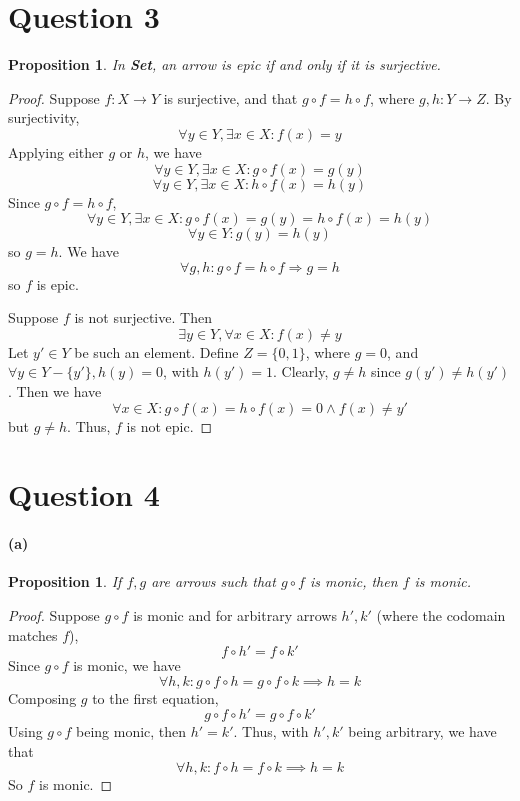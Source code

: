 \documentclass[11pt]{article} %
\newtheorem{proposition}[theorem]{Proposition}
\theoremstyle{definition}
\begin{document}
\section*{Question 3}
\addtocounter{section}{1}
\begin{proposition}
    In \textbf{Set}, an arrow is epic if and only if it is surjective.
\end{proposition}
\begin{proof}
    Suppose $f:X\rightarrow Y$ is surjective, and that $g\circ f=h\circ f$, where $g,h:Y\rightarrow Z$.
    By surjectivity,
    \[\forall y\in Y, \exists x\in X: f(x)=y\]
    Applying either $g$ or $h$, we have
    \[\forall y\in Y, \exists x\in X: g\circ f(x)=g(y)\]
    \[\forall y\in Y, \exists x\in X: h\circ f(x)=h(y)\]
    Since $g\circ f=h\circ f$,
    \[\forall y\in Y, \exists x\in X: g\circ f(x)=g(y)=h\circ f(x)=h(y)\]
    \[\forall y\in Y: g(y)=h(y)\]
    so $g=h$.
    We have 
    \[\forall g,h: g\circ f = h\circ f \Rightarrow g = h\]
    so $f$ is epic.

    Suppose $f$ is not surjective. Then
    \[\exists y\in Y,\forall x\in X: f(x)\neq y\]
    Let $y'\in Y$ be such an element.
    Define $Z=\{0,1\}$, where $g=0$, and $\forall y\in Y-\{y'\},h(y)=0$, with $h(y')=1$.
    Clearly, $g\neq h$ since $g(y')\neq h(y')$.
    Then we have
    \[\forall x\in X: g\circ f(x) = h\circ f(x)=0\wedge f(x)\neq y'\]
    but $g\neq h$.
    Thus, $f$ is not epic.

\end{proof}

\clearpage
\section*{Question 4}
\addtocounter{section}{1}
\paragraph{(a)}
\begin{proposition}
    If $f,g$ are arrows such that $g\circ f$ is monic, then $f$ is monic.
\end{proposition}
\begin{proof}
    Suppose $g\circ f$ is monic and for arbitrary arrows $h',k'$ (where the codomain matches $f$),
    \[f\circ h' = f\circ k'\]
    Since $g\circ f$ is monic, we have
    \[\forall h,k: g\circ f\circ h = g\circ f \circ k \implies h=k\]
    Composing $g$ to the first equation,
    \[g\circ f\circ h' = g\circ f\circ k'\]
    Using $g\circ f$ being monic, then $h'=k'$.
    Thus, with $h',k'$ being arbitrary, we have that
    \[\forall h,k:  f\circ h = f \circ k \implies h=k\]
    So $f$ is monic.
\end{proof}
\end{document}

